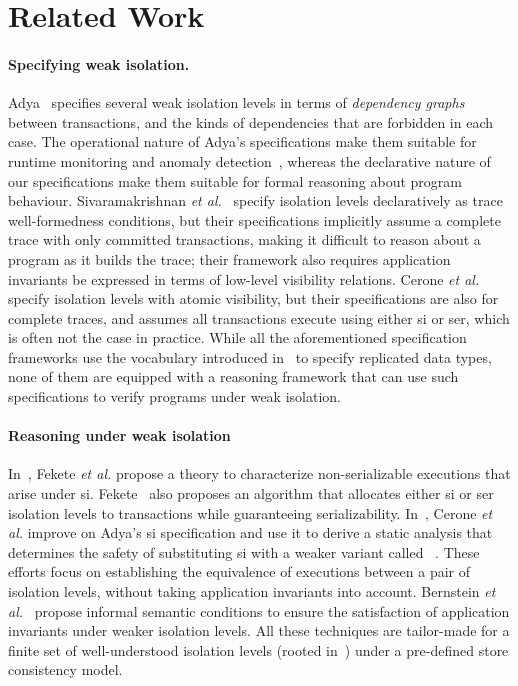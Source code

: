 \vspace*{-6pt}
\section{Related Work}
\label{sec:relatedwork}

\paragraph{Specifying weak isolation.}
Adya~\cite{adyaphd} specifies several weak isolation levels in terms
of \emph{dependency graphs} between transactions, and the kinds of
dependencies that are forbidden in each case. The operational nature
of Adya's specifications make them suitable for runtime monitoring and
anomaly detection~\cite{kemmevldb,feketesigmod08,pssi2011}, whereas
the declarative nature of our specifications make them suitable for
formal reasoning about program behaviour. Sivaramakrishnan \emph{et
  al.}~\cite{pldi15} specify isolation levels declaratively as trace
well-formedness conditions, but their specifications implicitly assume
a complete trace with only committed transactions, making it difficult
to reason about a program as it builds the trace; their framework also
requires application invariants be expressed in terms of low-level
visibility relations.  Cerone \emph{et al.}~\cite{gotsmanconcur15} specify
isolation levels with atomic visibility, but their specifications are
also for complete traces, and assumes all transactions execute using
either {\sc si} or {\sc ser}, which is often not the case in
practice. While all the aforementioned specification frameworks use
the vocabulary introduced in~\cite{burckhardt14} to specify replicated
data types, none of them are equipped with a reasoning framework that
can use such specifications to verify programs under weak isolation.

\vspace*{-4pt}
\paragraph{Reasoning under weak isolation} In~\cite{feketessi}, Fekete
\emph{et al.} propose a theory to characterize non-serializable
executions that arise under {\sc si}. Fekete~\cite{fekete2005} also
proposes an algorithm that allocates either {\sc si} or {\sc ser}
isolation levels to transactions while guaranteeing
serializability. In~\cite{gotsmanpodc16}, Cerone \emph{et al.} improve
on Adya's {\sc si} specification and use it to derive a static
analysis that determines the safety of substituting {\sc si} with a
weaker variant called ~\cite{psi}.
These efforts focus on establishing the equivalence of executions
between a pair of isolation levels, without taking application
invariants into account.  Bernstein \emph{et al.}~\cite{bern2000}
propose informal semantic conditions to ensure the satisfaction of
application invariants under weaker isolation levels.  All these
techniques are tailor-made for a finite set of well-understood
isolation levels (rooted in~\cite{berenson}) under a pre-defined store
consistency model.


